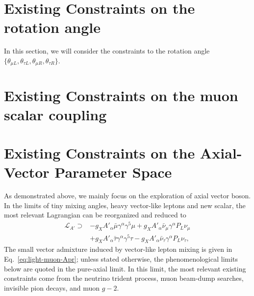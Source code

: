 \documentclass[onecolumn, aps, nofootinbib, prd, preprint, floats, floatfix, amsmath, amssymb, superscriptaddress, preprintnumbers]{revtex4-2}
\newcommand{\zb}[1]{{\color{blue} {#1}}}
\begin{document}
\section{Existing Constraints on the rotation angle}
\label{sec:theta_constraint}

\zb{In this section, we will consider the constraints to the rotation angle $\{\theta_{\mu L}, \theta_{\tau L}, \theta_{\mu R},\theta_{\tau R}\}$.}




\section{Existing Constraints on the muon scalar coupling}
\label{sec:scalar_constraint}

\section{Existing Constraints on the Axial-Vector Parameter Space}
\label{sec:phenomenology}
As demonstrated above, we mainly focus on the exploration of axial vector boson. In the limits of tiny mixing angles, heavy vector-like leptons and new scalar, the most relevant Lagrangian can be reorganized and reduced to
\begin{equation}
\begin{aligned}
\mathcal{L}_{A'} \supset & -g_XA'_\alpha\bar\mu\gamma^\alpha\gamma^5\mu
+g_XA'_\alpha\bar\nu_\mu\gamma^\alpha P_L\nu_\mu \\
&+g_X A'_\alpha\bar\tau\gamma^\alpha\gamma^5\tau - g_X A'_\alpha\bar\nu_\tau\gamma^\alpha P_L\nu_\tau,
\end{aligned}
\label{eq:phenomenology-coupling-convention}
\end{equation}
The small vector admixture induced by vector-like lepton mixing is given in Eq.~\eqref{eq:light-muon-Apr}; unless stated otherwise, the phenomenological limits below are quoted in the pure-axial limit. In this limit, the most relevant existing constraints come from the neutrino trident process, muon beam-dump searches, invisible pion decays, and muon $g-2$. 
\end{document}
